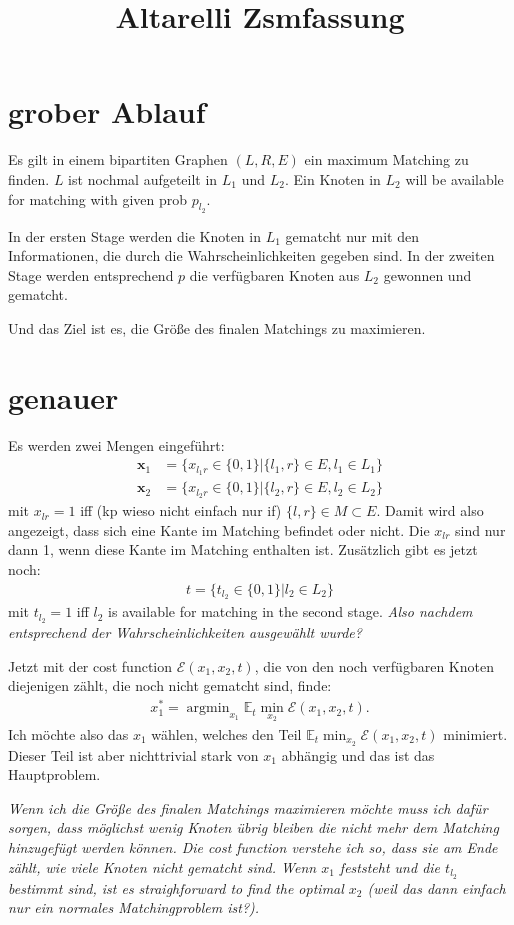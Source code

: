 \documentclass[paper=a4,10pt]{scrartcl}
\DeclareMathOperator*{\argmin}{argmin}
\begin{document}
\title{Altarelli Zsmfassung}

\section{grober Ablauf}
Es gilt in einem bipartiten Graphen $(L,R,E)$ ein maximum Matching zu finden. $L$ ist nochmal aufgeteilt in $L_1$ und $L_2$. Ein Knoten in $L_2$ will be available for matching with given prob $p_{l_2}$. 

In der ersten Stage werden die Knoten in $L_1$ gematcht nur mit den Informationen, die durch die Wahrscheinlichkeiten gegeben sind. In der zweiten Stage werden entsprechend $p$ die verfügbaren Knoten aus $L_2$ gewonnen und gematcht.

Und das Ziel ist es, die Größe des finalen Matchings zu maximieren.

\section{genauer}
Es werden zwei Mengen eingeführt: 
\begin{align}
\bm x_1 &= \{ x_{{l_1}r} \in \{0,1\} | \{ l_1,r\} \in E, l_1\in L_1 \} \\
\bm x_2 &= \{ x_{{l_2}r} \in \{0,1\} | \{ l_2,r\} \in E, l_2\in L_2 \}
\end{align}
mit $x_{lr}=1$ iff (kp wieso nicht einfach nur if) $\{ l,r\} \in M \subset E$. Damit wird also angezeigt, dass sich eine Kante im Matching befindet oder nicht. Die $x_{lr}$ sind nur dann 1, wenn diese Kante im Matching enthalten ist.
Zusätzlich gibt es jetzt noch:
\begin{align}
t=\{t_{l_2} \in \{0,1\}| l_2\in L_2\}
\end{align}
mit $t_{l_2}=1$ iff $l_2$ is available for matching in the second stage. \textit{Also nachdem entsprechend der Wahrscheinlichkeiten ausgewählt wurde?}

Jetzt mit der cost function $\mathcal{E} (x_1,x_2,t)$, die von den noch verfügbaren Knoten diejenigen zählt, die noch nicht gematcht sind, finde:
\begin{align}
x_1^* = \argmin_{x_1} \mathbb{E}_t \min_{x_2} \mathcal{E}(x_1,x_2,t).
\end{align}
Ich möchte also das $x_1$ wählen, welches den Teil $\mathbb{E}_t \min_{x_2} \mathcal{E}(x_1,x_2,t)$ minimiert. Dieser Teil ist aber nichttrivial stark von $x_1$ abhängig und das ist das Hauptproblem.

\textit{Wenn ich die Größe des finalen Matchings maximieren möchte muss ich dafür sorgen, dass möglichst wenig Knoten übrig bleiben die nicht mehr dem Matching hinzugefügt werden können. Die cost function verstehe ich so, dass sie am Ende zählt, wie viele Knoten nicht gematcht sind. Wenn $x_1$ feststeht und die $t_{l_2}$ bestimmt sind, ist es straighforward to find the optimal $x_2$ (weil das dann einfach nur ein normales Matchingproblem ist?).}
\end{document}
